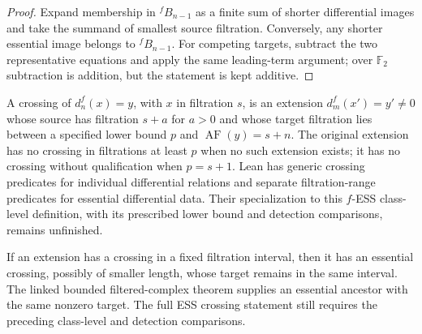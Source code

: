 \begin{proof}
  Expand membership in ${}^fB_{n-1}$ as a finite sum of shorter differential
  images and take the summand of smallest source filtration.  Conversely, any
  shorter essential image belongs to ${}^fB_{n-1}$.  For competing targets,
  subtract the two representative equations and apply the same leading-term
  argument; over $\mathbb F_2$ subtraction is addition, but the statement is
  kept additive.
\end{proof}

\begin{definition}
  \label{def:fess-crossing}
  \notready
  A crossing of $d_n^f(x)=y$, with $x$ in filtration $s$, is an extension
  $d_m^f(x')=y'\ne0$ whose source has filtration $s+a$ for $a>0$ and whose
  target filtration lies between a specified lower bound $p$ and
  $\operatorname{AF}(y)=s+n$.  The original extension has no crossing in
  filtrations at least $p$ when no such extension exists; it has no crossing
  without qualification when $p=s+1$.
  Lean has generic crossing predicates for individual differential relations
  and separate filtration-range predicates for essential differential data.
  Their specialization to this $f$-ESS class-level definition, with its
  prescribed lower bound and detection comparisons, remains unfinished.
\end{definition}

\begin{lemma}
  \label{lem:crossing-has-essential-crossing}
  \notready
  If an extension has a crossing in a fixed filtration interval, then it has
  an essential crossing, possibly of smaller length, whose target remains in
  the same interval.
  The linked bounded filtered-complex theorem supplies an essential ancestor
  with the same nonzero target.  The full ESS crossing statement still
  requires the preceding class-level and detection comparisons.
\end{lemma}

